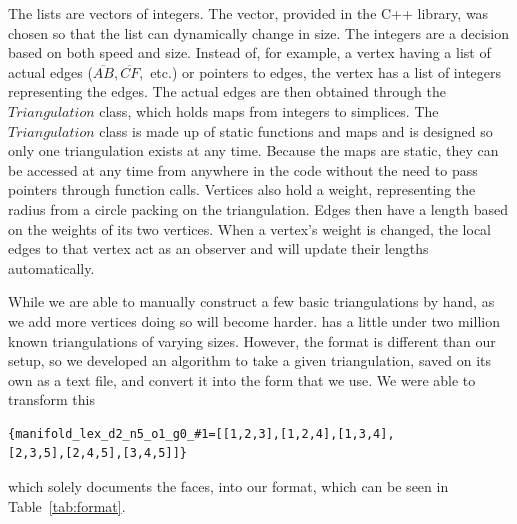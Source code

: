 \documentclass[12pt]{article}
\begin{document}
\noindent The lists are vectors of integers. The vector, provided in the C++ library, was chosen so that the list can dynamically change in size. The integers are a decision based on both speed and size. Instead of, for example, a vertex having a list of actual edges ($\overline{AB}, \overline{CF},$ etc.) or pointers to edges, the vertex has a list of integers representing the edges. The actual edges are then obtained through the $Triangulation$ class, which holds maps from integers to simplices. The $Triangulation$ class is made up of static functions and maps and is designed so only one triangulation exists at any time. Because the maps are static, they can be accessed at any time from anywhere in the code without the need to pass pointers through function calls. Vertices also hold a weight, representing the radius from a circle packing on the triangulation. Edges then have a length based on the weights of its two vertices. When a vertex's weight is changed, the local edges to that vertex act as an observer and will update their lengths automatically.\newline


\noindent While we are able to manually construct a few basic triangulations by hand, as we add more vertices doing so will become harder. \cite{lutzmanifold} has a little under two million known triangulations of varying sizes. However, the format is different than our setup, so we developed an algorithm to take a given triangulation, saved on its own as a text file, and convert it into the form that we use. We were able to transform this
  
\begin{verbatim}{manifold_lex_d2_n5_o1_g0_#1=[[1,2,3],[1,2,4],[1,3,4],
[2,3,5],[2,4,5],[3,4,5]]}
\end{verbatim}
 
\noindent which solely documents the faces, into our format, which can be seen in Table~\ref{tab:format}.
\end{document}
